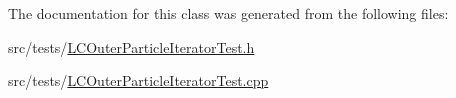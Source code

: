 The documentation for this class was generated from the following files\-:\begin{DoxyCompactItemize}
\item 
src/tests/\hyperlink{LCOuterParticleIteratorTest_8h}{L\-C\-Outer\-Particle\-Iterator\-Test.\-h}\item 
src/tests/\hyperlink{LCOuterParticleIteratorTest_8cpp}{L\-C\-Outer\-Particle\-Iterator\-Test.\-cpp}\end{DoxyCompactItemize}
